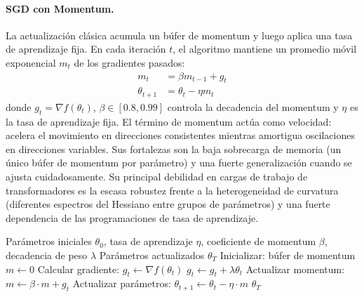 \paragraph{SGD con Momentum.}
La actualización clásica acumula un búfer de momentum y luego aplica una tasa de aprendizaje fija. En cada iteración $t$, el algoritmo mantiene un promedio móvil exponencial $m_t$ de los gradientes pasados:
\begin{align}
m_t &= \beta m_{t-1} + g_t \\
\theta_{t+1} &= \theta_t - \eta m_t
\end{align}
donde $g_t = \nabla f(\theta_t)$, $\beta \in [0.8, 0.99]$ controla la decadencia del momentum y $\eta$ es la tasa de aprendizaje fija. El término de momentum actúa como velocidad: acelera el movimiento en direcciones consistentes mientras amortigua oscilaciones en direcciones variables. Sus fortalezas son la baja sobrecarga de memoria (un único búfer de momentum por parámetro) y una fuerte generalización cuando se ajusta cuidadosamente. Su principal debilidad en cargas de trabajo de transformadores es la escasa robustez frente a la heterogeneidad de curvatura (diferentes espectros del Hessiano entre grupos de parámetros) y una fuerte dependencia de las programaciones de tasa de aprendizaje.

\begin{algorithm}[H]
\caption{SGD con Momentum}
\label{alg:sgd-momentum}
\begin{algorithmic}[1]
\Require Parámetros iniciales $\theta_0$, tasa de aprendizaje $\eta$, coeficiente de momentum $\beta$, decadencia de peso $\lambda$
\Ensure Parámetros actualizados $\theta_T$
\State Inicializar: búfer de momentum $m \gets 0$
    \State Calcular gradiente: $g_t \gets \nabla f(\theta_t)$
        \State $g_t \gets g_t + \lambda \theta_t$ 
    \EndIf
    \State Actualizar momentum: $m \gets \beta \cdot m + g_t$
    \State Actualizar parámetros: $\theta_{t+1} \gets \theta_t - \eta \cdot m$
\EndFor
\Return $\theta_T$
\end{algorithmic}
\end{algorithm}

